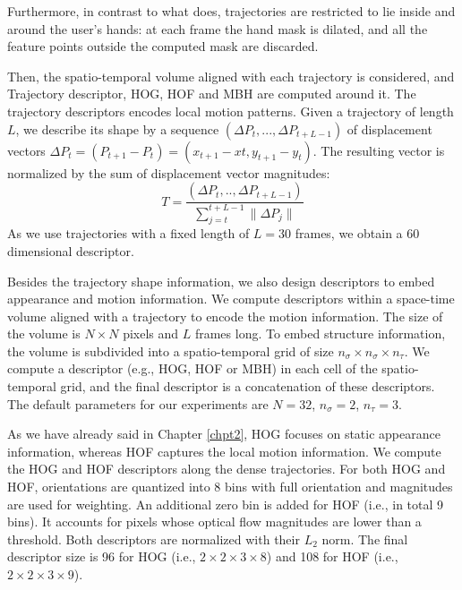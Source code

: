 Furthermore, in contrast to what \cite{wang:2011:inria-00583818:1} does, trajectories are restricted to lie inside and around the user's hands: at each frame the hand mask is dilated, and all the feature points outside the computed mask are discarded.


Then, the spatio-temporal volume aligned with each trajectory is considered, and Trajectory descriptor, HOG, HOF and MBH are computed around it. The trajectory descriptors encodes local motion patterns. Given a trajectory of length $L$, we describe its
shape by a sequence $(\Delta P_t, ..., \Delta P_{t+L-1})$ of displacement vectors $\Delta P_t = (P_{t+1}- P_t) = (x_{t+1} -
xt, y_{t+1}- y_t)$. The resulting vector is normalized by the sum of displacement vector magnitudes:
\begin{equation}
T = \frac{(\Delta P_t, .., \Delta P_{t+L-1})}{\sum_{j=t}^{t+L-1} \| \Delta P_j \|}
\end{equation}
As we use trajectories with a fixed length of $L = 30$ frames, we obtain a 60 dimensional descriptor.

Besides the trajectory shape information, we also design descriptors to embed appearance and motion
information. We compute
descriptors within a space-time volume aligned with a trajectory to encode the motion information. The size of the volume is $N \times N$ pixels and $L$ frames long. To embed structure information, the volume is subdivided into a spatio-temporal grid of size $n_\sigma \times n_\sigma \times n_\tau$. We compute a descriptor (e.g.,
HOG, HOF or MBH) in each cell of the spatio-temporal grid, and the final descriptor is a concatenation
of these descriptors. The default parameters for our experiments are $N = 32$, $n_\sigma = 2$, $n_\tau = 3$.

As we have already said in Chapter \ref{chpt2}, HOG focuses on static appearance information, whereas HOF captures the
local motion information. We compute the HOG and HOF descriptors along the dense trajectories. For both HOG and HOF,
orientations are quantized into 8 bins with full orientation and magnitudes are used for weighting. An
additional zero bin is added for HOF (i.e., in total 9 bins). It accounts for pixels whose optical flow
magnitudes are lower than a threshold. Both descriptors are normalized with their $L_2$ norm. The final
descriptor size is 96 for HOG (i.e., $2\times 2\times 3\times 8$) and 108 for HOF (i.e., $2\times 2 \times 3 \times 9$).

